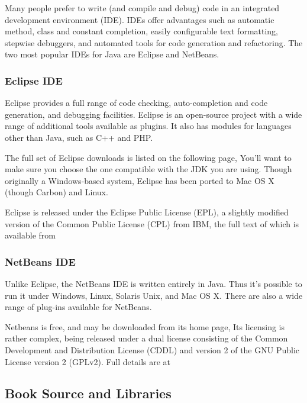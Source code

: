 Many people prefer to write (and compile and debug) code in an
integrated development environment (IDE).  IDEs offer advantages such
as automatic method, class and constant completion, easily
configurable text formatting, stepwise debuggers, and automated tools
for code generation and refactoring.
The two most popular IDEs for Java are Eclipse and NetBeans.

\subsubsection{Eclipse IDE}

Eclipse provides a full range of code checking, auto-completion
and code generation, and debugging facilities.  Eclipse is an open-source
project with a wide range of additional tools available as plugins.  It
also has modules for languages other than Java, such as C++ and PHP.

The full set of Eclipse downloads is listed on the following page,
%
%
You'll want to make sure you choose the one compatible with the JDK
you are using.  Though originally a Windows-based system, Eclipse has been
ported to Mac OS X (though Carbon) and Linux.  

Eclipse is released under the Eclipse Public License (EPL), a slightly modified
version of the Common Public License (CPL) from IBM, the full text of which is
available from
%


\subsubsection{NetBeans IDE}

Unlike Eclipse, the NetBeans IDE is written entirely in Java.  Thus
it's possible to run it under Windows, Linux, Solaris Unix, and Mac OS
X. There are also a wide range of plug-ins available for NetBeans.

Netbeans is free, and may be downloaded from its home page,
%
%
Its licensing is rather complex, being released under a dual license
consisting of the Common Development and Distribution License (CDDL)
and version 2 of the GNU Public License version 2 (GPLv2).  Full details
are at
%


\subsection{Book Source and Libraries}


